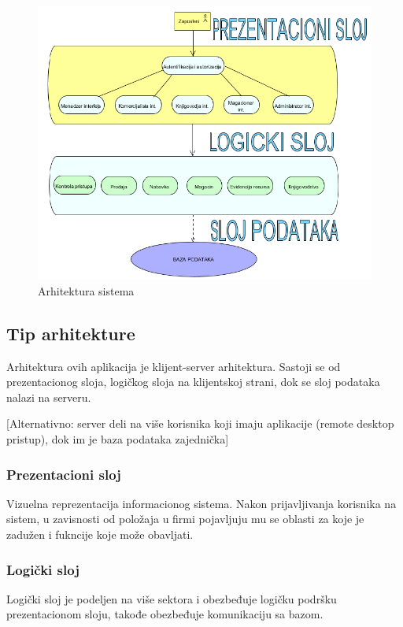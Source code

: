 \begin{figure}[ht]
\centering
\includegraphics[width=165mm]{slike/Arhitektura.png}%
\caption{Arhitektura sistema}
\end{figure}

\subsection{Tip arhitekture}

Arhitektura ovih aplikacija je klijent-server arhitektura. Sastoji se od prezentacionog sloja,
logičkog sloja na klijentskoj strani, dok se sloj podataka nalazi na serveru.

[Alternativno: server deli na više korisnika koji imaju aplikacije (remote desktop pristup), dok im je baza podataka zajednička]

\subsubsection{Prezentacioni sloj}

Vizuelna reprezentacija
informacionog sistema. Nakon prijavljivanja korisnika na sistem, u zavisnosti od položaja u firmi pojavljuju mu se oblasti za koje je zadužen i fukncije koje može obavljati.

\subsubsection{Logički sloj}

Logički sloj je podeljen na više sektora i obezbeđuje logičku podršku prezentacionom
sloju, takođe obezbeđuje komunikaciju sa bazom.

